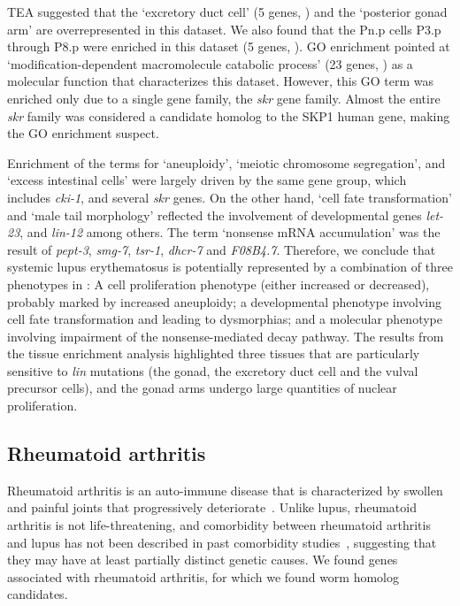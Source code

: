 TEA suggested that the
`excretory duct cell' (5 genes, ) and the `posterior gonad arm' are
overrepresented in this dataset. We also found that the Pn.p cells P3.p through
P8.p were enriched in this dataset (5 genes, ). GO enrichment pointed
at `modification-dependent macromolecule catabolic process' (23 genes,
) as a molecular function that characterizes this dataset. However,
this GO term was enriched only due to a single gene family, the \emph{skr} gene
family. Almost the entire \emph{skr} family was considered a candidate homolog
to the SKP1 human gene, making the GO enrichment suspect.

Enrichment of the terms for `aneuploidy', `meiotic chromosome segregation',
and `excess intestinal cells' were largely driven by the same gene group, which
includes \emph{cki-1}, and several \emph{skr} genes. On the other hand, `cell
fate transformation' and `male tail morphology' reflected the involvement of
developmental genes \emph{let-23}, and \emph{lin-12} among others. The term
`nonsense mRNA accumulation' was the result of \emph{pept-3}, \emph{smg-7},
\emph{tsr-1}, \emph{dhcr-7} and \emph{F08B4.7}. Therefore, we conclude that
systemic lupus erythematosus is potentially represented by a combination of three
phenotypes in \cel{}: A cell proliferation phenotype (either increased or
decreased), probably marked by increased
aneuploidy; a developmental phenotype involving cell fate transformation and
leading to dysmorphias; and a molecular phenotype involving impairment of the
nonsense-mediated decay pathway.
The results from the tissue enrichment analysis
highlighted three tissues that are particularly sensitive to \emph{lin} mutations
(the gonad, the excretory duct cell and the vulval precursor cells),
and the gonad arms undergo large quantities of nuclear proliferation.

\subsection*{Rheumatoid arthritis}
Rheumatoid arthritis is an auto-immune disease that is characterized by
swollen and painful joints that progressively deteriorate~\citep{Smolen2016}. Unlike lupus,
rheumatoid arthritis is not life-threatening, and comorbidity between rheumatoid
arthritis and lupus has not been described in past comorbidity studies~\citep{Dougados2013},
suggesting that they may have at least
partially distinct genetic causes. We found \harthritis{} genes associated with
rheumatoid arthritis, for which we found \warthritis{} worm homolog candidates.

